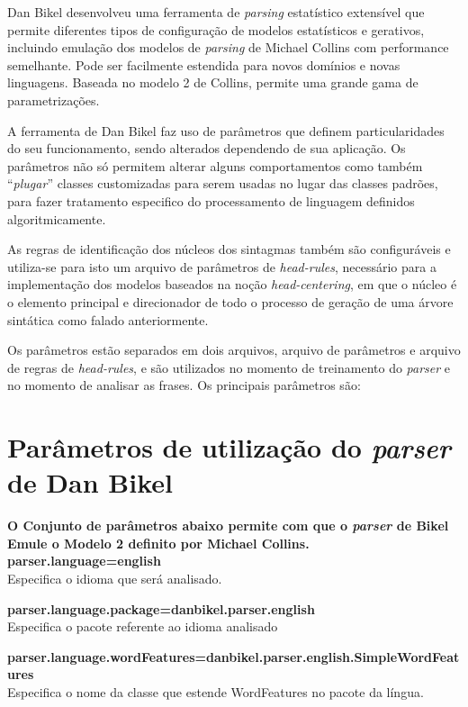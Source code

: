 Dan Bikel desenvolveu uma ferramenta de \emph{parsing} estatístico extensível que permite diferentes tipos de configuração de modelos estatísticos e gerativos, incluindo emulação dos modelos de \emph{parsing} de Michael Collins com performance semelhante. Pode ser facilmente estendida para novos domínios e novas linguagens. Baseada no modelo 2 de Collins, permite uma grande gama de parametrizações.

A ferramenta de Dan Bikel faz uso de parâmetros que definem particularidades do seu funcionamento, sendo alterados dependendo de sua aplicação. Os parâmetros não só permitem alterar alguns comportamentos como também ``\emph{plugar}'' classes customizadas para serem usadas no lugar das classes padrões, para fazer tratamento especifico do processamento de linguagem definidos algoritmicamente.

As regras de identificação dos núcleos dos sintagmas também são configuráveis e utiliza-se para isto um arquivo de parâmetros de \emph{head-rules}, necessário para a implementação dos modelos baseados na noção \emph{head-centering}, em que o núcleo é o elemento principal e direcionador de todo o processo de geração de uma árvore sintática como falado anteriormente.

Os parâmetros estão separados em dois arquivos, arquivo de parâmetros e arquivo de regras de \emph{head-rules}, e são utilizados no momento de treinamento do \emph{parser} e no momento de analisar as frases. Os principais parâmetros são:

\section{Parâmetros de utilização do \emph{parser} de Dan Bikel}
\label{sec:bikelest_param}

\scriptsize

\textbf{O Conjunto de parâmetros abaixo permite com que o \emph{parser} de Bikel Emule o Modelo 2 definito por Michael Collins.}\\

\textbf{parser.language=english}\\
Especifica o idioma que será analisado.

\textbf{parser.language.package=danbikel.parser.english}\\
Especifica o pacote referente ao idioma analisado

\textbf{parser.language.wordFeatures=danbikel.parser.english.SimpleWordFeatures}\\
Especifica o nome da classe que estende WordFeatures no pacote da língua.


